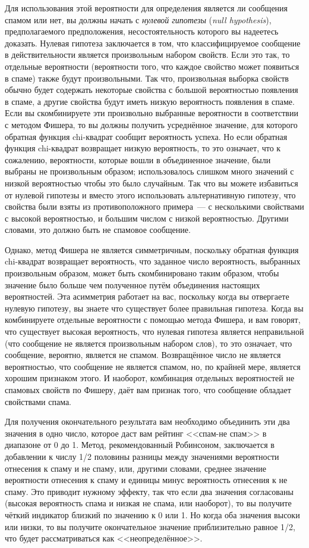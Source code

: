 Для использования этой вероятности для определения является ли сообщения спамом или нет,
вы должны начать с \textit{нулевой гипотезы} (\textit{null hypothesis}), предполагаемого
предположения, несостоятельность которого вы надеетесь доказать. Нулевая гипотеза
заключается в том, что классифицируемое сообщение в действительности является произвольным
набором свойств.  Если это так, то отдельные вероятности (вероятности того, что каждое
свойство может появиться в спаме) также будут произвольными.  Так что, произвольная
выборка свойств обычно будет содержать некоторые свойства с большой вероятностью появления
в спаме, а другие свойства будут иметь низкую вероятность появления в спаме.  Если вы
скомбинируете эти произвольно выбранные вероятности в соответствии с методом Фишера, то вы
должны получить усреднённое значение, для которого обратная функция chi-квадрат сообщит
вероятность успеха.  Но если обратная функция chi-квадрат возвращает низкую вероятность,
то это означает, что к сожалению, вероятности, которые вошли в объединенное значение, были
выбраны не произвольным образом; использовалось слишком много значений с низкой
вероятностью чтобы это было случайным. Так что вы можете избавиться от нулевой гипотезы и
вместо этого использовать альтернативную гипотезу, что свойства были взяты из
противоположного примера~--- с несколькими свойствами с высокой вероятностью, и большим
числом с низкой вероятностью.  Другими словами, это должно быть не спамовое сообщение.

Однако, метод Фишера не является симметричным, поскольку обратная функция chi-квадрат
возвращает вероятность, что заданное число вероятность, выбранных произвольным образом,
может быть скомбинировано таким образом, чтобы значение было больше чем полученное путём
объединения настоящих вероятностей.  Эта асимметрия работает на вас, поскольку когда вы
отвергаете нулевую гипотезу, вы знаете что существует более правильная гипотеза.  Когда вы
комбинируете отдельные вероятности с помощью метода Фишера, и вам говорят, что существует
высокая вероятность, что нулевая гипотеза является неправильной (что сообщение не является
произвольным набором слов), то это означает, что сообщение, вероятно, является не спамом.
Возвращённое число не является вероятностью, что сообщение не является спамом, но, по
крайней мере, является хорошим признаком этого.  И наоборот, комбинация отдельных
вероятностей не спамовых свойств по Фишеру, даёт вам признак того, что сообщение обладает
свойствами спама.

Для получения окончательного результата вам необходимо объединить эти два значения в одно
число, которое даст вам рейтинг <<спам-не спам>> в диапазоне от 0 до 1.  Метод,
рекомендованный Робинсоном, заключается в добавлении к числу 1/2 половины разницы между
значениями вероятности отнесения к спаму и не спаму, или, другими словами, среднее
значение вероятности отнесения к спаму и единицы минус вероятность отнесения к не спаму.
Это приводит нужному эффекту, так что если два значения согласованы (высокая вероятность
спама и низкая не спама, или наоборот), то вы получите чёткий индикатор близкий по
значению к 0 или 1.  Но когда оба значения высоки или низки, то вы получите окончательное
значение приблизительно равное 1/2, что будет рассматриваться как <<неопределённое>>.

